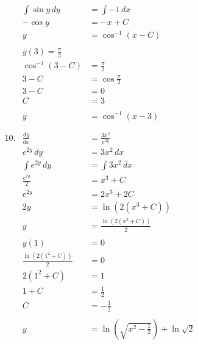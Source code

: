 \documentclass[12pt]{article}
\begin{document}
\begin{multicols}{2}
\begin{align*}
        &&\int \sin \! y\,dy &= \int -1\,dx \\
        &&-\cos y &= -x + C \\
        &&y &= \cos^{-1}(x - C) \\ \\
        &&y(3) = \frac{\pi}{2} \\
        &&\cos^{-1}(3 - C) &= \frac{\pi}{2} \\
        &&3 - C &= \cos \frac{\pi}{2} \\
        &&3 - C &= 0 \\
        &&C &= 3 \\ \\
        &&y &= \cos^{-1}(x - 3) \\ \\ \\
        &10.& \frac{dy}{dx} &= \frac{3x^2}{e^{2y}} \\
        &&e^{2y}\,dy &= 3x^2\,dx \\
        &&\int e^{2y}\,dy &= \int 3x^2\,dx \\
        &&\frac{e^{2y}}{2} &= x^3 + C \\
        &&e^{2y} &= 2x^3 +2C \\
        &&2y &= \ln \left( 2\left(x^3 + C\right) \right) \\
        &&y &= \frac{\ln \left( 2\left(x^3 + C\right) \right)}{2} \\ \\
        &&y(1) &= 0 \\
        &&\frac{\ln \left( 2\left(1^2 + C\right) \right)}{2} &= 0 \\
        &&2\left(1^2+C\right) &= 1 \\
        &&1+C &= \frac{1}{2} \\
        &&C &= -\frac{1}{2} \\ \\
        &&y &= \ln \left( \sqrt{x^2 - \frac{1}{2}} \right) + \ln \sqrt{2} \\ \\ \\
    \end{align*}
\end{multicols}

\end{document}
